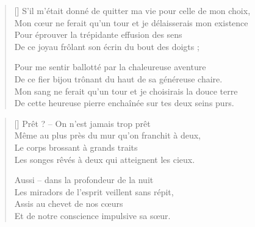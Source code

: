\newpage

\settowidth{\versewidth}{Mon cœur ne ferait qu'un tour et je délaisserais mon existence}
\begin{verse}[\versewidth]
S'il m'était donné de quitter ma vie pour celle de mon choix, \\
Mon cœur ne ferait qu'un tour et je délaisserais mon existence \\
Pour éprouver la trépidante effusion des sens \\
De ce joyau frôlant son écrin du bout des doigts ;

Pour me sentir ballotté par la chaleureuse aventure \\
De ce fier bijou trônant du haut de sa généreuse chaire. \\
Mon sang ne ferait qu'un tour et je choisirais la douce terre \\
De cette heureuse pierre enchaînée sur tes deux seins purs.
\end{verse}


\settowidth{\versewidth}{Mon cœur ne ferait qu'un tour et je délaisserais mon existence}
\begin{verse}[\versewidth]
Prêt ? -- On n'est jamais trop prêt \\
Même au plus près du mur qu'on franchit à deux, \\
Le corps brossant à grands traits \\
Les songes rêvés à deux qui atteignent les cieux.

Aussi -- dans la profondeur de la nuit \\
Les miradors de l'esprit veillent sans répit, \\
Assis au chevet de nos cœurs \\
Et de notre conscience impulsive sa sœur.
\end{verse}

\newpage

